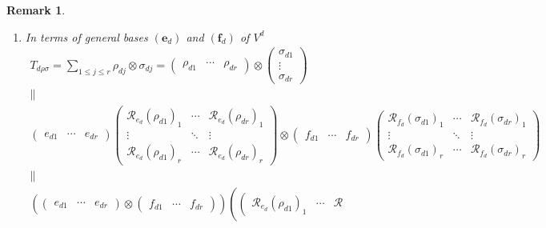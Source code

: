 \documentclass[aps,preprint]{revtex4}
\newtheorem{remark}[theorem]{Remark}
\begin{document}
\begin{remark}
\begin{enumerate}
\begin{enumerate}
\item In terms of general bases $\left( \boldsymbol{e}_{d}\right) $ and $%
\left( \boldsymbol{f}_{d}\right) $ of $V^{d}$ 
\begin{gather}
T_{d\rho \sigma }=\sum_{1\leq j\leq r}\rho _{dj}\otimes \sigma _{dj}=\left( 
\begin{array}{ccc}
\rho _{d1} & \cdots & \rho _{dr}%
\end{array}%
\right) \otimes \left( 
\begin{array}{c}
\sigma _{d1} \\ 
\vdots \\ 
\sigma _{dr}%
\end{array}%
\right) \\
\parallel \\
\left( 
\begin{array}{ccc}
e_{d1} & \cdots & e_{dr}%
\end{array}%
\right) \left( 
\begin{array}{ccc}
\mathcal{R}_{e_{d}}\left( \rho _{d1}\right) _{1} & \cdots & \mathcal{R}%
_{e_{d}}\left( \rho _{dr}\right) _{1} \\ 
\vdots & \ddots & \vdots \\ 
\mathcal{R}_{e_{d}}\left( \rho _{d1}\right) _{r} & \cdots & \mathcal{R}%
_{e_{d}}\left( \rho _{dr}\right) _{r}%
\end{array}%
\right) \otimes \left( 
\begin{array}{ccc}
f_{d1} & \cdots & f_{dr}%
\end{array}%
\right) \left( 
\begin{array}{ccc}
\mathcal{R}_{f_{d}}\left( \sigma _{d1}\right) _{1} & \cdots & \mathcal{R}%
_{f_{d}}\left( \sigma _{dr}\right) _{1} \\ 
\vdots & \ddots & \vdots \\ 
\mathcal{R}_{f_{d}}\left( \sigma _{d1}\right) _{r} & \cdots & \mathcal{R}%
_{f_{d}}\left( \sigma _{dr}\right) _{r}%
\end{array}%
\right) \\
\parallel \\
\left( \overset{}{\left( 
\begin{array}{ccc}
e_{d1} & \cdots & e_{dr}%
\end{array}%
\right) \otimes \left( 
\begin{array}{ccc}
f_{d1} & \cdots & f_{dr}%
\end{array}%
\right) }\right) \left( \overset{}{\left( 
\begin{array}{ccc}
\mathcal{R}_{e_{d}}\left( \rho _{d1}\right) _{1} & \cdots & \mathcal{R}%

\end{array}}
\end{gather}
\end{enumerate}
\end{enumerate}
\end{remark}
\end{document}
